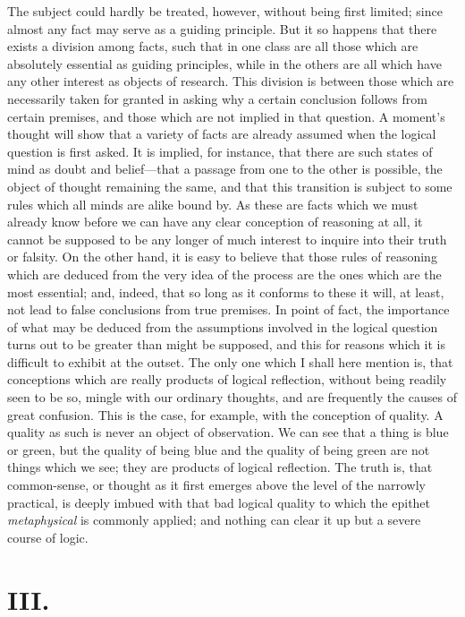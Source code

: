 The subject could hardly be treated, however, without being first
limited; since almost any fact may serve as a guiding principle. But
it so happens that there exists a division among facts, such that in
one class are all those which are absolutely essential as guiding
principles, while in the others are all which have any other interest
as objects of research. This division is between those which are
necessarily taken for granted in asking why a certain conclusion
follows from certain premises, and those which are not implied in that
question. A moment's thought will show that a variety of facts are
already assumed when the logical question is first asked. It is
implied, for instance, that there are such states of mind as doubt and
be\-lief---that a passage from one to the other is possible, the
object of thought remaining the same, and that this transition is
subject to some rules which all minds are alike bound by. As these are
facts  which we must already know before we can have any clear
conception of reasoning at all, it cannot be supposed to be any longer
of much interest to inquire into their truth or falsity. On the other
hand, it is easy to believe that those rules of reasoning which are
deduced from the very idea of the process are the ones which are the
most essential; and, indeed, that so long as it conforms to these it
will, at least, not lead to false conclusions from true premises. In
point of fact, the importance of what may be deduced from the
assumptions involved in the logical question turns out to be greater
than might be supposed, and this for reasons which it is difficult to
exhibit at the outset. The only one which I shall here mention is,
that conceptions which are really products of logical reflection,
without being readily seen to be so, mingle with our ordinary
thoughts, and are frequently the causes of great confusion. This is
the case, for example, with the conception of quality. A quality as
such is never an object of observation. We can see that a thing is
blue or green, but the quality of being blue and the quality of being
green are not things which we see; they are products of logical
reflection. The truth is, that common-sense, or thought as it first
emerges above the level of the narrowly practical, is deeply imbued
with that bad logical quality to which the epithet
\textit{metaphysical} is commonly applied; and nothing can clear it up
but a severe course of logic.

\section{III.}

